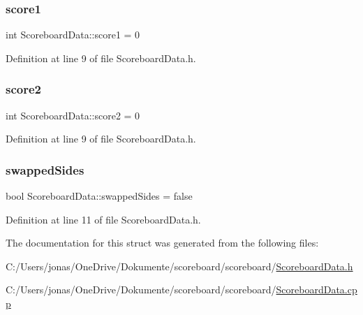 \subsubsection{\texorpdfstring{score1}{score1}}
{\footnotesize\ttfamily int Scoreboard\+Data\+::score1 = 0}



Definition at line 9 of file Scoreboard\+Data.\+h.

\mbox{\label{struct_scoreboard_data_a51ddc426391e48da3a6c9cf2a3a76e32}} 
\subsubsection{\texorpdfstring{score2}{score2}}
{\footnotesize\ttfamily int Scoreboard\+Data\+::score2 = 0}



Definition at line 9 of file Scoreboard\+Data.\+h.

\mbox{\label{struct_scoreboard_data_a6e1aabe8d6abc24c5798c2de90b54c71}} 
\subsubsection{\texorpdfstring{swapped\+Sides}{swappedSides}}
{\footnotesize\ttfamily bool Scoreboard\+Data\+::swapped\+Sides = false}



Definition at line 11 of file Scoreboard\+Data.\+h.



The documentation for this struct was generated from the following files\+:\begin{DoxyCompactItemize}
\item 
C\+:/\+Users/jonas/\+One\+Drive/\+Dokumente/scoreboard/scoreboard/\hyperlink{_scoreboard_data_8h}{Scoreboard\+Data.\+h}\item 
C\+:/\+Users/jonas/\+One\+Drive/\+Dokumente/scoreboard/scoreboard/\hyperlink{_scoreboard_data_8cpp}{Scoreboard\+Data.\+cpp}\end{DoxyCompactItemize}
